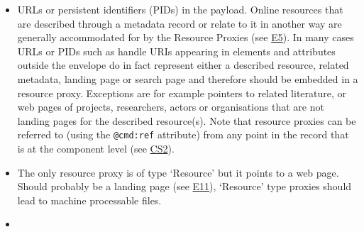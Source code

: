 \begin{itemize}
\item
  URLs or persistent identifiers (PIDs) in the payload. Online resources that are described through a metadata record or relate to it in another way are generally accommodated for by the Resource Proxies (see \hyperref[e5]{E5}). In many cases URLs or PIDs such as handle URIs appearing in elements and attributes outside the envelope do in fact represent either a
  described resource, related metadata, landing page or search page and therefore should be embedded in a resource proxy. Exceptions are for example pointers to related literature, or web pages of projects, researchers, actors or organisations that are not landing pages for the described resource(s). Note that resource proxies can be referred to (using the \texttt{@cmd:ref} attribute) from any point in the
  record that is at the component level (see \hyperref[cs2]{CS2}).
\item
  The only resource proxy is of type `Resource' but it points to a web page. Should probably be a landing page (see \hyperref[e11]{E11}), `Resource' type proxies should lead to machine processable files.
\item
\end{itemize}
